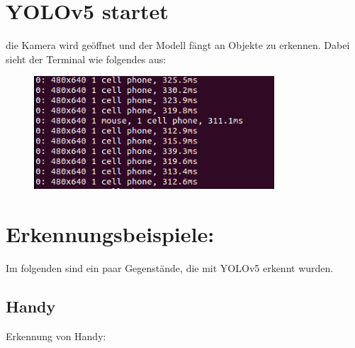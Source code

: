\documentclass{article}
\begin{document}


\clearpage
\section{YOLOv5 startet}
die Kamera wird geöffnet und der Modell fängt an Objekte zu erkennen.
Dabei sieht der Terminal wie folgendes aus: 
\begin{figure}[h!]
    \centering
    \includegraphics[width=0.8\textwidth]{Bilder/terminalErgebnisse.png}
\end{figure}

\section{Erkennungsbeispiele:}
Im folgenden sind ein paar Gegenstände, die mit YOLOv5 erkennt wurden.
\subsection{Handy}
Erkennung von Handy: 
\end{document}
